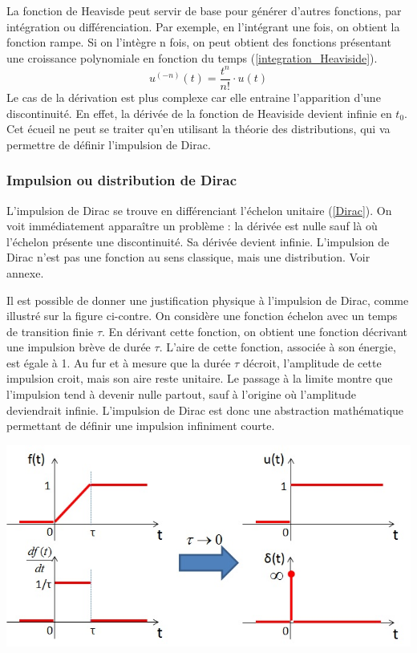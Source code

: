 \documentclass[]{book}
\begin{document}
{	La fonction de Heavisde peut servir de base pour générer d'autres fonctions, par intégration ou différenciation. Par exemple, en l'intégrant une fois, on obtient la fonction rampe. Si on l'intègre n fois, on peut obtient des fonctions présentant une croissance polynomiale en fonction du temps (\ref{integration_Heaviside}). 
	\begin{equation}\label{integration_Heaviside}
	u^{(-n)}(t) = \frac{t^{n}}{n!} \cdot u(t)	 	
	\end{equation}	
	Le cas de la dérivation est plus complexe car elle entraine l'apparition d'une discontinuité. En effet, la dérivée de la fonction de Heaviside devient infinie en $t_{0}$. Cet écueil ne peut se traiter qu'en utilisant la théorie des distributions, qui va permettre de définir l'impulsion de Dirac.
	
	\subsubsection{Impulsion ou distribution de Dirac}
	
	L'impulsion de Dirac se trouve en différenciant l'échelon unitaire (\ref{Dirac}). On
	voit immédiatement apparaître un problème : la dérivée est nulle sauf là
	où l'échelon présente une discontinuité. Sa dérivée devient infinie.
	L'impulsion de Dirac n'est pas une fonction au sens classique, mais une
	distribution. Voir annexe. 

	
	\begin{minipage}[l]{0.45\linewidth}
			Il est possible de donner une justification physique à l'impulsion de Dirac, comme illustré sur la figure ci-contre. On considère une fonction échelon avec un temps de transition finie $\tau$. En dérivant cette fonction, on obtient une fonction décrivant une impulsion brève de durée $\tau$. L'aire de cette fonction, associée à son énergie, est égale à 1. Au fur et à mesure que la durée $\tau$ décroit, l'amplitude de cette impulsion croit, mais son aire reste unitaire. Le passage à la limite montre que l'impulsion tend à devenir nulle partout, sauf à l'origine où l'amplitude deviendrait infinie. L'impulsion de Dirac est donc une abstraction mathématique permettant de définir une impulsion infiniment courte.	
	\end{minipage} \hfill
	\begin{minipage}[r]{0.55\linewidth}
		\includegraphics[scale=0.5]{images/generation_Dirac.jpg} 	
	\end{minipage}
	\vspace{0.5\baselineskip}
	
}
\end{document}
